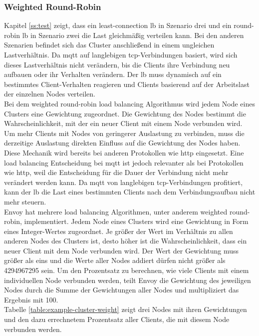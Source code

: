 \subsubsection{Weighted Round-Robin} \label{ss:weighted-rr}
Kapitel \ref{ss:test} zeigt, dass ein least-connection \acl{lb} in Szenario drei und ein round-robin \ac{lb} in Szenario zwei die Last gleichmä{\ss}ig verteilen kann.
Bei den anderen Szenarien befindet sich das Cluster anschlie{\ss}end in einem ungleichen Lastverhältnis.
Da \ac{mqtt} auf langlebigen \ac{tcp}-Verbindungen basiert, wird sich dieses Lastverhältnis nicht verändern, bis die Clients ihre Verbindung neu aufbauen oder ihr Verhalten verändern.
Der \ac{lb} muss dynamisch auf ein bestimmtes Client-Verhalten reagieren und Clients basierend auf der Arbeitslast der einzelnen Nodes verteilen.
\\
Bei dem weighted round-robin load balancing Algorithmus wird jedem Node eines Clusters eine Gewichtung zugeordnet. Die Gewichtung des Nodes bestimmt die Wahrscheinlichkeit, mit der ein neuer Client mit einem Node verbunden wird.
Um mehr Clients mit Nodes von geringerer Auslastung zu verbinden, muss die derzeitige Auslastung direkten Einfluss auf die Gewichtung des Nodes haben.
Diese Mechanik wird bereits bei anderen Protokollen wie \ac{http} eingesetzt.
Eine load balancing Entscheidung bei \ac{mqtt} ist jedoch relevanter als bei Protokollen wie \ac{http}, weil die Entscheidung für die Dauer der Verbindung nicht mehr verändert werden kann. Da \ac{mqtt} von langlebigen \ac{tcp}-Verbindungen profitiert, kann der \ac{lb} die Last eines bestimmten Clients nach dem Verbindungsaufbau nicht mehr steuern.
\\
Envoy hat mehrere load balancing Algorithmen, unter anderem weighted round-robin, implementiert.
Jedem Node eines Clusters wird eine Gewichtung in Form eines Integer-Wertes zugeordnet.
Je grö{\ss}er der Wert im Verhältnis zu allen anderen Nodes des Clusters ist, desto höher ist die Wahrscheinlichkeit, dass ein neuer Client mit dem Node verbunden wird. Der Wert der Gewichtung muss grö{\ss}er als eins und die Werte aller Nodes addiert dürfen nicht grö{\ss}er als 4294967295 sein.
Um den Prozentsatz zu berechnen, wie viele Clients mit einem individuellen Node verbunden werden, teilt Envoy die Gewichtung des jeweiligen Nodes durch die Summe der Gewichtungen aller Nodes und multipliziert das Ergebnis mit 100.
\cite{SupportedLoadBalancers}
\\
Tabelle \ref{table:example-cluster-weight} zeigt drei Nodes mit ihren Gewichtungen und den dazu errechnetem Prozentsatz aller Clients, die mit diesem Node verbunden werden.
